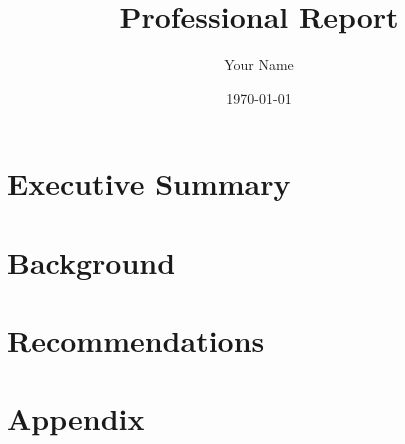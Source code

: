 \documentclass[11pt]{article}
\title{Professional Report}
\author{Your Name}
\date{\today}
\begin{document}
\maketitle

\section{Executive Summary}

\section{Background}

\section{Recommendations}

\section{Appendix}
\end{document}
